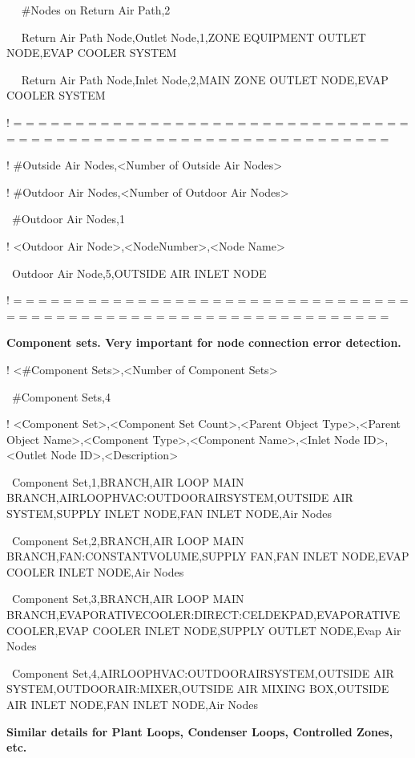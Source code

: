 ~~ \#Nodes on Return Air Path,2

~~ Return Air Path Node,Outlet Node,1,ZONE EQUIPMENT OUTLET NODE,EVAP COOLER SYSTEM

~~ Return Air Path Node,Inlet Node,2,MAIN ZONE OUTLET NODE,EVAP COOLER SYSTEM

! = = = = = = = = = = = = = = = = = = = = = = = = = = = = = = = = = = = = = = = = = = = = = = = = = = = = = = = = = = = = = = =

! \#Outside Air Nodes,\textless{}Number of Outside Air Nodes\textgreater{}

! \#Outdoor Air Nodes,\textless{}Number of Outdoor Air Nodes\textgreater{}

~\#Outdoor Air Nodes,1

! \textless{}Outdoor Air Node\textgreater{},\textless{}NodeNumber\textgreater{},\textless{}Node Name\textgreater{}

~Outdoor Air Node,5,OUTSIDE AIR INLET NODE

! = = = = = = = = = = = = = = = = = = = = = = = = = = = = = = = = = = = = = = = = = = = = = = = = = = = = = = = = = = = = = = =

\textbf{Component sets. Very important for node connection error detection.}

! \textless{}\#Component Sets\textgreater{},\textless{}Number of Component Sets\textgreater{}

~\#Component Sets,4

! \textless{}Component Set\textgreater{},\textless{}Component Set Count\textgreater{},\textless{}Parent Object Type\textgreater{},\textless{}Parent Object Name\textgreater{},\textless{}Component Type\textgreater{},\textless{}Component Name\textgreater{},\textless{}Inlet Node ID\textgreater{},\textless{}Outlet Node ID\textgreater{},\textless{}Description\textgreater{}

~Component Set,1,BRANCH,AIR LOOP MAIN BRANCH,AIRLOOPHVAC:OUTDOORAIRSYSTEM,OUTSIDE AIR SYSTEM,SUPPLY INLET NODE,FAN INLET NODE,Air Nodes

~Component Set,2,BRANCH,AIR LOOP MAIN BRANCH,FAN:CONSTANTVOLUME,SUPPLY FAN,FAN INLET NODE,EVAP COOLER INLET NODE,Air Nodes

~Component Set,3,BRANCH,AIR LOOP MAIN BRANCH,EVAPORATIVECOOLER:DIRECT:CELDEKPAD,EVAPORATIVE COOLER,EVAP COOLER INLET NODE,SUPPLY OUTLET NODE,Evap Air Nodes

~Component Set,4,AIRLOOPHVAC:OUTDOORAIRSYSTEM,OUTSIDE AIR SYSTEM,OUTDOORAIR:MIXER,OUTSIDE AIR MIXING BOX,OUTSIDE AIR INLET NODE,FAN INLET NODE,Air Nodes

\textbf{Similar details for Plant Loops, Condenser Loops, Controlled Zones, etc.}
